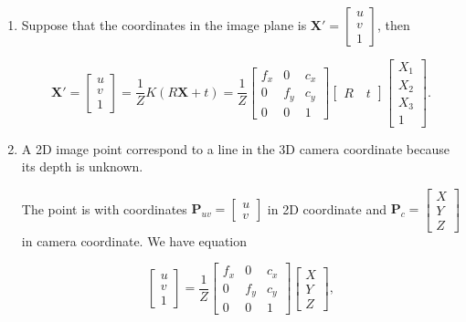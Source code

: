 \documentclass{article}
\begin{document}
\begin{enumerate}
\item Suppose that the coordinates in the image plane is $\boldsymbol X' = \begin{bmatrix} u \\ v \\ 1 \end{bmatrix}$, then

$$
\boldsymbol X' = \begin{bmatrix} u \\ v \\ 1 \end{bmatrix} = \frac 1Z K(R\boldsymbol X + t) = \frac 1Z \begin{bmatrix} f_x & 0 & c_x \\ 0 & f_y & c_y \\ 0 & 0 & 1 \end{bmatrix} \begin{bmatrix} R \quad t \end{bmatrix} \begin{bmatrix} X_1 \\ X_2 \\ X_3 \\ 1 \end{bmatrix}.
$$

\item A 2D image point correspond to a line in the 3D camera coordinate because its depth is unknown. 

The point is with coordinates $\boldsymbol P_{uv} = \begin{bmatrix} u \\ v \end{bmatrix}$ in 2D coordinate and $\boldsymbol P_c = \begin{bmatrix} X \\ Y \\ Z \end{bmatrix}$ in camera coordinate. We have equation

$$
\begin{bmatrix} u \\ v \\ 1 \end{bmatrix} = \frac 1Z \begin{bmatrix} f_x & 0 & c_x \\ 0 & f_y & c_y \\ 0 & 0 & 1 \end{bmatrix} \begin{bmatrix} X \\ Y \\ Z \end{bmatrix},
$$


\end{enumerate}
\end{document}

